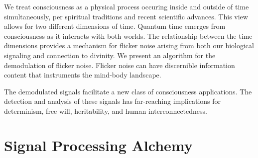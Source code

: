 \documentclass[oneside,11pt]{memoir} %
\begin{document}
We treat consciousness as a physical process occuring inside and outside of time
simultaneously, per spiritual traditions and recent scientific advances.
This view allows for two different dimensions of time.
Quantum time emerges from consciousness as it interacts with both worlds.
The relationship between the time dimensions provides a mechanism for flicker
noise arising from both our biological signaling and connection to divinity.
We present an algorithm for the demodulation of flicker noise.
Flicker noise can have discernible information content that instruments the
mind-body landscape.

The demodulated signals facilitate a new class of consciousness applications.
The detection and analysis of these signals has far-reaching implications for
determinism, free will, heritability, and human interconnectedness.


\chapter{Signal Processing Alchemy}



%





\end{document}
